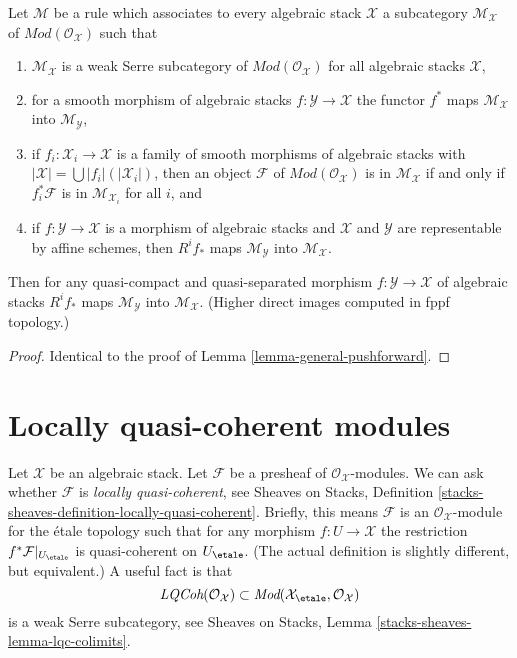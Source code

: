 \begin{lemma}
\label{lemma-general-pushforward-fppf}
Let $\mathcal{M}$ be a rule which associates to every algebraic stack
$\mathcal{X}$ a subcategory $\mathcal{M}_\mathcal{X}$ of
$\textit{Mod}(\mathcal{O}_\mathcal{X})$
such that
\begin{enumerate}
\item $\mathcal{M}_\mathcal{X}$ is a weak Serre subcategory
of $\textit{Mod}(\mathcal{O}_\mathcal{X})$
for all algebraic stacks $\mathcal{X}$,
\item for a smooth morphism of algebraic stacks
$f : \mathcal{Y} \to \mathcal{X}$ the functor $f^*$ maps
$\mathcal{M}_\mathcal{X}$ into $\mathcal{M}_\mathcal{Y}$,
\item if $f_i : \mathcal{X}_i \to \mathcal{X}$ is a family of smooth
morphisms of algebraic stacks with
$|\mathcal{X}| = \bigcup |f_i|(|\mathcal{X}_i|)$, then an object
$\mathcal{F}$ of $\textit{Mod}(\mathcal{O}_\mathcal{X})$
is in $\mathcal{M}_\mathcal{X}$ if and only if
$f_i^*\mathcal{F}$ is in $\mathcal{M}_{\mathcal{X}_i}$ for all $i$, and
\item if $f : \mathcal{Y} \to \mathcal{X}$ is a morphism of algebraic
stacks and $\mathcal{X}$ and $\mathcal{Y}$ are representable
by affine schemes, then $R^if_*$ maps $\mathcal{M}_\mathcal{Y}$
into $\mathcal{M}_\mathcal{X}$.
\end{enumerate}
Then for any quasi-compact and quasi-separated morphism 
$f : \mathcal{Y} \to \mathcal{X}$ of algebraic stacks
$R^if_*$ maps $\mathcal{M}_\mathcal{Y}$
into $\mathcal{M}_\mathcal{X}$. (Higher direct images computed in fppf
topology.)
\end{lemma}

\begin{proof}
Identical to the proof of Lemma \ref{lemma-general-pushforward}.
\end{proof}


\section{Locally quasi-coherent modules}
\label{section-locally-quasi-coherent}

\noindent
Let $\mathcal{X}$ be an algebraic stack. Let $\mathcal{F}$ be a presheaf
of $\mathcal{O}_\mathcal{X}$-modules. We can ask whether $\mathcal{F}$
is {\it locally quasi-coherent}, see
Sheaves on Stacks, Definition
\ref{stacks-sheaves-definition-locally-quasi-coherent}.
Briefly, this means $\mathcal{F}$ is an $\mathcal{O}_\mathcal{X}$-module
for the \'etale topology such that for any morphism $f : U \to \mathcal{X}$
the restriction $f^*\mathcal{F}|_{U_\etale}$ is quasi-coherent
on $U_\etale$. (The actual definition is slightly different, but
equivalent.) A useful fact is that
$$
\textit{LQCoh}(\mathcal{O}_\mathcal{X}) \subset
\textit{Mod}(\mathcal{X}_\etale, \mathcal{O}_\mathcal{X})
$$
is a weak Serre subcategory, see
Sheaves on Stacks, Lemma \ref{stacks-sheaves-lemma-lqc-colimits}.


